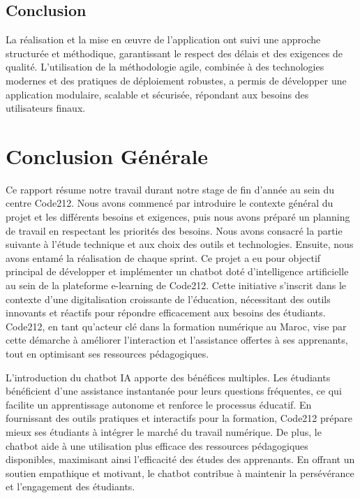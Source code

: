 \documentclass[a4paper, 11pt, openany]{report}
\begin{document}
\section{Conclusion}
La réalisation et la mise en œuvre de l'application ont suivi une approche structurée et méthodique, garantissant le respect des délais et des exigences de qualité. L'utilisation de la méthodologie agile, combinée à des technologies modernes et des pratiques de déploiement robustes, a permis de développer une application modulaire, scalable et sécurisée, répondant aux besoins des utilisateurs finaux.


\chapter{Conclusion Générale}

Ce rapport résume notre travail durant notre stage de fin d’année au sein du centre Code212. Nous avons commencé par introduire le contexte général du projet et les différents besoins et exigences, puis nous avons préparé un planning de travail en respectant les priorités des besoins. Nous avons consacré la partie suivante à l’étude technique et aux choix des outils et technologies. Ensuite, nous avons entamé la réalisation de chaque sprint.
\newline
Ce projet a eu pour objectif principal de développer et implémenter un chatbot doté d'intelligence artificielle au sein de la plateforme e-learning de Code212. Cette initiative s'inscrit dans le contexte d'une digitalisation croissante de l'éducation, nécessitant des outils innovants et réactifs pour répondre efficacement aux besoins des étudiants. Code212, en tant qu'acteur clé dans la formation numérique au Maroc, vise par cette démarche à améliorer l'interaction et l'assistance offertes à ses apprenants, tout en optimisant ses ressources pédagogiques.
\newline

L'introduction du chatbot IA apporte des bénéfices multiples. Les étudiants bénéficient d'une assistance instantanée pour leurs questions fréquentes, ce qui facilite un apprentissage autonome et renforce le processus éducatif. En fournissant des outils pratiques et interactifs pour la formation, Code212 prépare mieux ses étudiants à intégrer le marché du travail numérique. De plus, le chatbot aide à une utilisation plus efficace des ressources pédagogiques disponibles, maximisant ainsi l'efficacité des études des apprenants. En offrant un soutien empathique et motivant, le chatbot contribue à maintenir la persévérance et l'engagement des étudiants.
\end{document}
